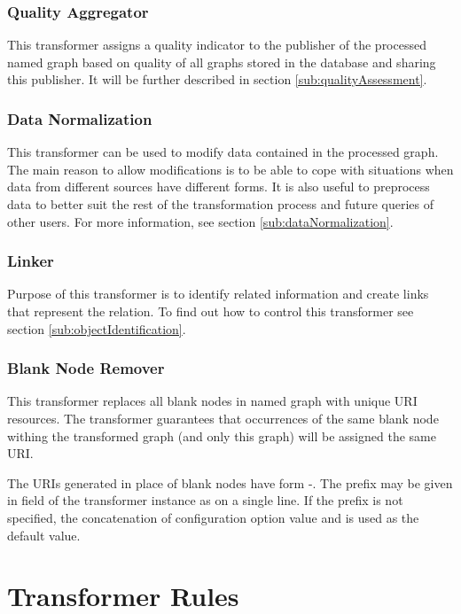 \subsubsection{Quality Aggregator}

This transformer assigns a quality indicator to the publisher of the processed named graph based on quality of all graphs stored in the database and sharing this publisher. It will be further described in section \ref{sub:qualityAssessment}.

\subsubsection{Data Normalization}

This transformer can be used to modify data contained in the processed graph. The main reason to allow modifications is to be able to cope with situations when data from different sources have different forms. It is also useful to preprocess data to better suit the rest of the transformation process and future queries of other users. For more information, see section \ref{sub:dataNormalization}.

\subsubsection{Linker}
Purpose of this transformer is to identify related information and create links that represent the relation. To find out how to control this transformer see section \ref{sub:objectIdentification}.

\subsubsection{Blank Node Remover}
This transformer replaces all blank nodes in  named graph with unique URI resources. The transformer guarantees that occurrences of the same blank node withing the transformed graph (and only this graph) will be assigned the same URI.

The URIs generated in place of blank nodes have form -. The prefix may be given in  field of the transformer instance as  on a single line. If the prefix is not specified, the concatenation of  configuration option value and  is used as the default value.

\section{Transformer Rules}
\label{sec:transformerRules}

